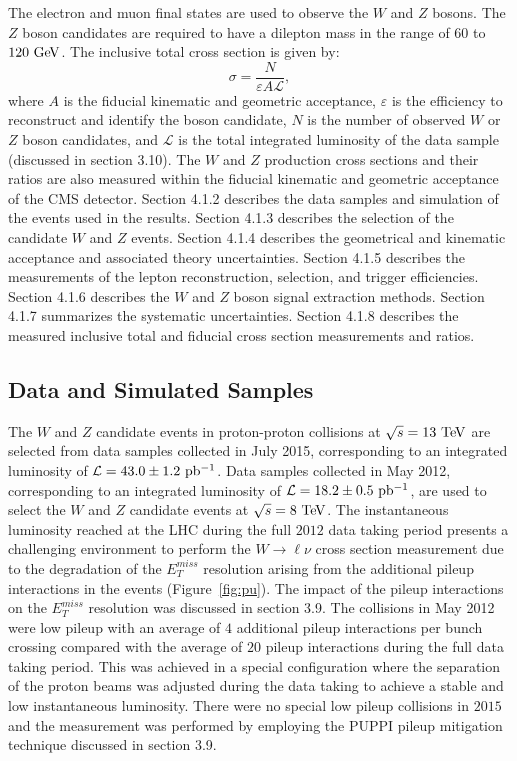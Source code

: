 The electron and muon final states are used to observe the $W$ and $Z$ bosons. The $Z$ boson candidates are required to have a dilepton mass in the range of $60$ to $120~\mathrm{Ge\kern -0.1em V}$. The inclusive total cross section is given by:  
\begin{equation} \label{eq:xsec2}
\sigma = \frac{N}{\varepsilon A \mathcal{L}},
\end{equation}
where $A$ is the fiducial kinematic and geometric acceptance, $\varepsilon$ is the efficiency to reconstruct and identify the boson candidate, $N$ is the number of observed $W$ or $Z$ boson candidates, and $\mathcal{L}$ is the total integrated luminosity of the data sample (discussed in section 3.10).  The $W$ and $Z$ production cross sections and their ratios are also measured within the fiducial kinematic and geometric acceptance of the CMS detector.  Section 4.1.2 describes the data samples and simulation of the events used in the results. Section 4.1.3 describes the selection of the candidate $W$ and $Z$ events. Section 4.1.4 describes the geometrical and kinematic acceptance and associated theory uncertainties. Section 4.1.5 describes the measurements of the lepton reconstruction, selection, and trigger efficiencies. Section 4.1.6 describes the $W$ and $Z$ boson signal extraction methods. Section 4.1.7 summarizes the systematic uncertainties. Section 4.1.8 describes the measured inclusive total and fiducial cross section measurements and ratios.  

\subsection{Data and Simulated Samples}

The $W$ and $Z$ candidate events in proton-proton collisions at $\sqrt{s}=13~\mathrm{Te\kern -0.1em V}$ are selected from data samples collected in July 2015, corresponding to an integrated luminosity of $\mathcal{L}=43.0\pm1.2~\mathrm{pb^{-1}}$. Data samples collected in May 2012, corresponding to an integrated luminosity of $\mathcal{L}=18.2\pm0.5~\mathrm{pb^{-1}}$, are used to select the $W$ and $Z$ candidate events at $\sqrt{s}=8~\mathrm{Te\kern -0.1em V}$. The instantaneous luminosity reached at the LHC during the full $2012$ data taking period presents a challenging environment to perform the $W \rightarrow \ell \nu$ cross section measurement due to the degradation of the $E_{T}^{miss}$ resolution arising from the additional pileup interactions in the events (Figure~\ref{fig:pu}). The impact of the pileup interactions on the $E_{T}^{miss}$ resolution was discussed in section 3.9. The collisions in May 2012 were low pileup with an average of $4$ additional pileup interactions per bunch crossing compared with the average of $20$ pileup interactions during the full data taking period. This was achieved in a special configuration where the separation of the proton beams was adjusted during the data taking to achieve a stable and low instantaneous luminosity. There were no special low pileup collisions in $2015$ and the measurement was performed by employing the PUPPI pileup mitigation technique discussed in section 3.9.

